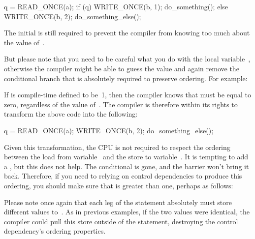 \begin{VerbatimU}
	q = READ_ONCE(a);
	if (q) {
		WRITE_ONCE(b, 1);
		do_something();
	} else {
		WRITE_ONCE(b, 2);
		do_something_else();
	}
\end{VerbatimU}

The initial  is still required to prevent the compiler from
knowing too much about the value of~.

But please note that you need to be careful what you do with the local
variable~, otherwise the compiler might be able to guess the value
and again remove the conditional branch that is absolutely required to
preserve ordering.
For example:


If  is compile-time defined to be~1, then the compiler knows that
 must be equal to zero, regardless of the value of~.
The compiler is therefore within its rights to transform the above code
into the following:

\begin{VerbatimU}
	q = READ_ONCE(a);
	WRITE_ONCE(b, 2);
	do_something_else();
\end{VerbatimU}

Given this transformation, the CPU is not required to respect the ordering
between the load from variable~ and the store to variable~.
It is tempting to add a , but this does not help.
The conditional is gone, and the barrier won't bring it back.
Therefore, if you need to relying on control dependencies to produce
this ordering, you should make sure that  is greater than one,
perhaps as follows:


Please note once again that each leg of the  statement absolutely
must store different values to~.  As in previous examples, if the two
values were identical, the compiler could pull this store outside of the
 statement, destroying the control dependency's ordering properties.

